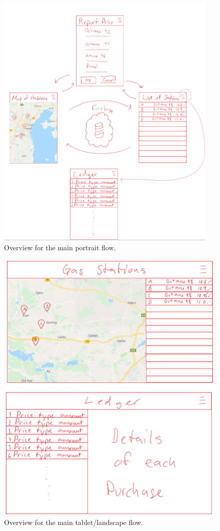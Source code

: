 \begin{figure}[h]
	\centering
	\includegraphics[width=0.95\textwidth]{P.png}
	\caption{Overview for the main portrait flow.}
	\label{fig:p}
\end{figure}

\begin{figure}[h]
	\centering
	\includegraphics[width=\textwidth]{L.png}
	\caption{Overview for the main tablet/landscape flow.}
	\label{fig:l}
\end{figure}

